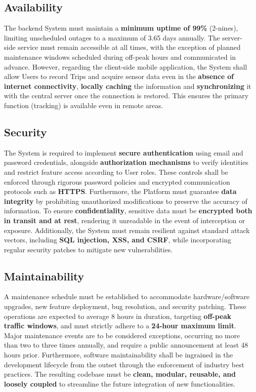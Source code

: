 \subsection{Availability}
The backend System must maintain a \textbf{minimum uptime of 99\%} (2-nines), limiting unscheduled outages to a maximum of 3.65 days annually. The server-side service must remain accessible at all times, with the exception of planned maintenance windows scheduled during off-peak hours and communicated in advance. 
However, regarding the client-side mobile application, the System shall allow Users to record Trips and acquire sensor data even in the \textbf{absence of internet connectivity}, \textbf{locally caching} the information and \textbf{synchronizing} it with the central server once the connection is restored. This ensures the primary function (tracking) is available even in remote areas. 

\subsection{Security}
The System is required to implement \textbf{secure authentication} using email and password credentials, alongside \textbf{authorization mechanisms} to verify identities and restrict feature access according to User roles. These controls shall be enforced through rigorous password policies and encrypted communication protocols such as \textbf{HTTPS}. Furthermore, the Platform must guarantee \textbf{data integrity} by prohibiting unauthorized modifications to preserve the accuracy of information. To ensure \textbf{confidentiality}, sensitive data must be \textbf{encrypted both in transit and at rest}, rendering it unreadable in the event of interception or exposure. Additionally, the System must remain resilient against standard attack vectors, including \textbf{SQL injection, XSS, and CSRF}, while incorporating regular security patches to mitigate new vulnerabilities.

\subsection{Maintainability}
A maintenance schedule must be established to accommodate hardware/software upgrades, new feature deployment, bug resolution, and security patching. These operations are expected to average 8 hours in duration, targeting \textbf{off-peak traffic windows}, and must strictly adhere to a \textbf{24-hour maximum limit}. Major maintenance events are to be considered exceptions, occurring no more than two to three times annually, and require a public announcement at least 48 hours prior. Furthermore, software maintainability shall be ingrained in the development lifecycle from the outset through the enforcement of industry best practices. The resulting codebase must be \textbf{clean, modular, reusable, and loosely coupled} to streamline the future integration of new functionalities.

